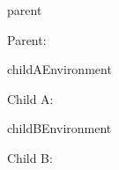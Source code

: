 \documentclass[12pt]{pnpprep}
\begin{document}
\begin{blueprint}{parent}


    \begin{render}
        \begin{panel}{\namevalue}
            Parent: \namevalue
            \par

            \renderChildren
        \end{panel}
    \end{render}
\end{blueprint}


\begin{blueprint}{childAEnvironment}

    \begin{render}
        Child A: \namevalue
        \par
    \end{render}
\end{blueprint}


\begin{blueprint}{childBEnvironment}

    \begin{render}
        Child B: \namevalue
        \par
    \end{render}
\end{blueprint}


\begin{parent}

    \begin{childA}
    \end{childA}

    \begin{childB}
    \end{childB}

\end{parent}
\end{document}
